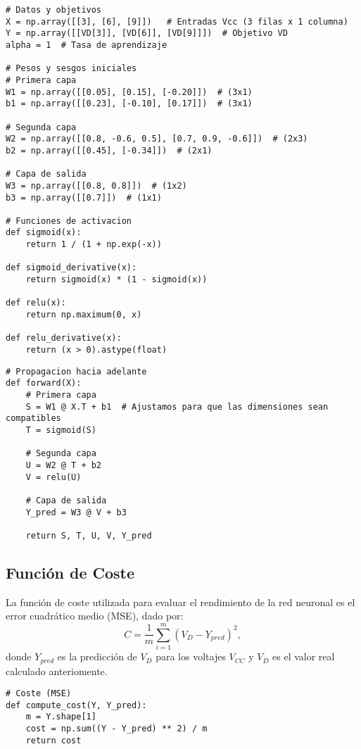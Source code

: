\documentclass[paper=a4, fontsize=11pt]{scrartcl} %
\numberwithin{equation}{section} %
\numberwithin{figure}{section} %
\numberwithin{table}{section} %
\begin{document}
\vspace{2mm}
\begin{lstlisting}
# Datos y objetivos
X = np.array([[3], [6], [9]])   # Entradas Vcc (3 filas x 1 columna)
Y = np.array([[VD[3]], [VD[6]], [VD[9]]])  # Objetivo VD
alpha = 1  # Tasa de aprendizaje

# Pesos y sesgos iniciales
# Primera capa
W1 = np.array([[0.05], [0.15], [-0.20]])  # (3x1)
b1 = np.array([[0.23], [-0.10], [0.17]])  # (3x1)

# Segunda capa
W2 = np.array([[0.8, -0.6, 0.5], [0.7, 0.9, -0.6]])  # (2x3)
b2 = np.array([[0.45], [-0.34]])  # (2x1)

# Capa de salida
W3 = np.array([[0.8, 0.8]])  # (1x2)
b3 = np.array([[0.7]])  # (1x1)

# Funciones de activacion
def sigmoid(x):
    return 1 / (1 + np.exp(-x))

def sigmoid_derivative(x):
    return sigmoid(x) * (1 - sigmoid(x))

def relu(x):
    return np.maximum(0, x)

def relu_derivative(x):
    return (x > 0).astype(float)
\end{lstlisting}
\vspace{10mm}
\begin{lstlisting}
# Propagacion hacia adelante
def forward(X):
    # Primera capa
    S = W1 @ X.T + b1  # Ajustamos para que las dimensiones sean compatibles
    T = sigmoid(S)

    # Segunda capa
    U = W2 @ T + b2
    V = relu(U)

    # Capa de salida
    Y_pred = W3 @ V + b3

    return S, T, U, V, Y_pred
\end{lstlisting}


\subsection{Función de Coste}

La función de coste utilizada para evaluar el rendimiento de la red neuronal es el error cuadrático medio (MSE), dado por:
\[
C = \frac{1}{m} \sum_{i=1}^m (V_D - Y_{pred})^2,
\]
donde $Y_{pred}$ es la predicción de $V_D$ para los voltajes $V_{CC}$ y $V_D$ es el valor real calculado anteriomente.

\vspace{2mm}
\begin{lstlisting}
# Coste (MSE)
def compute_cost(Y, Y_pred):
    m = Y.shape[1]
    cost = np.sum((Y - Y_pred) ** 2) / m
    return cost
\end{lstlisting}
\end{document}
